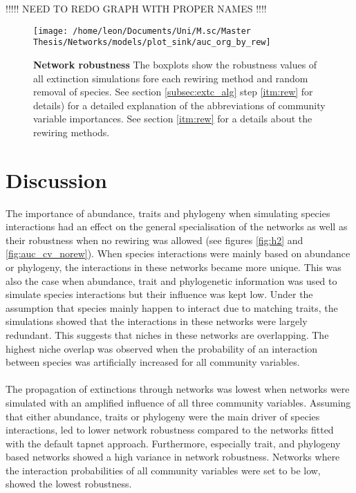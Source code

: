 \documentclass[12pt,a4paper]{article}
\begin{document}
!!!!! NEED TO REDO GRAPH WITH PROPER NAMES !!!!
\begin{figure}[H]
	 \texttt{[image: /home/leon/Documents/Uni/M.sc/Master Thesis/Networks/models/plot\_sink/auc\_org\_by\_rew]}
	 \caption{\textbf{Network robustness } The boxplots show the robustness values of all extinction simulations fore each rewiring method and random removal of species. See section \ref{subsec:extc_alg} step \ref{itm:rew} for details) for a detailed explanation of the abbreviations of community variable importances. See section \ref{itm:rew} for a details about the rewiring methods.}
	 \label{fig:auc_org_rew}
\end{figure}

\newpage
	\section{Discussion}

The importance of abundance, traits and phylogeny when simulating species interactions had an effect on the general specialisation of the networks as well as their robustness when no rewiring was allowed (see figures \ref{fig:h2} and \ref{fig:auc_cv_norew}). When species interactions were mainly based on abundance or phylogeny, the interactions in these networks became more unique. This was also the case when abundance, trait and phylogenetic information was used to simulate species interactions but their influence was kept low. Under the assumption that species mainly happen to interact due to matching traits, the simulations showed that the interactions in these networks were largely redundant. This suggests that niches in these networks are overlapping. The highest niche overlap was observed when the probability of an interaction between species was artificially increased for all community variables.\paragraph{}

The propagation of extinctions through networks was lowest when networks were simulated with an amplified influence of all three community variables. Assuming that either abundance, traits or phylogeny were the main driver of species interactions, led to lower network robustness compared to the networks fitted with the default tapnet approach. Furthermore, especially trait, and phylogeny based networks showed a high variance in network robustness. Networks where the interaction probabilities of all community variables were set to be low, showed the lowest robustness. \par
\end{document}
